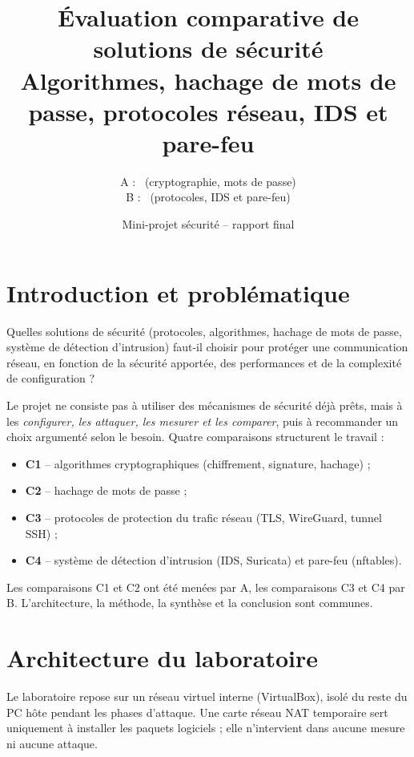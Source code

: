 \documentclass[11pt,a4paper]{article}
\title{\textbf{Évaluation comparative de solutions de sécurité}\\[4pt]
\large Algorithmes, hachage de mots de passe, protocoles réseau, IDS et pare-feu}
\author{A : \auteurA\ (cryptographie, mots de passe)\\
B : \auteurB\ (protocoles, IDS et pare-feu)}
\date{Mini-projet sécurité -- rapport final}
\begin{document}
\maketitle
\thispagestyle{empty}
\tableofcontents
\newpage

\section{Introduction et problématique}

Quelles solutions de sécurité (protocoles, algorithmes, hachage de mots de passe, système de
détection d'intrusion) faut-il choisir pour protéger une communication réseau, en fonction de la
sécurité apportée, des performances et de la complexité de configuration ?

Le projet ne consiste pas à utiliser des mécanismes de sécurité déjà prêts, mais à les
\emph{configurer, les attaquer, les mesurer et les comparer}, puis à recommander un choix
argumenté selon le besoin. Quatre comparaisons structurent le travail :
\begin{itemize}
  \item \textbf{C1} -- algorithmes cryptographiques (chiffrement, signature, hachage) ;
  \item \textbf{C2} -- hachage de mots de passe ;
  \item \textbf{C3} -- protocoles de protection du trafic réseau (TLS, WireGuard, tunnel SSH) ;
  \item \textbf{C4} -- système de détection d'intrusion (IDS, Suricata) et pare-feu (nftables).
\end{itemize}
Les comparaisons C1 et C2 ont été menées par A, les comparaisons C3 et C4 par B.
L'architecture, la méthode, la synthèse et la conclusion sont communes.

\section{Architecture du laboratoire}

Le laboratoire repose sur un réseau virtuel interne (VirtualBox), isolé du reste du PC hôte
pendant les phases d'attaque. Une carte réseau NAT temporaire sert uniquement à installer les
paquets logiciels ; elle n'intervient dans aucune mesure ni aucune attaque.
\end{document}
